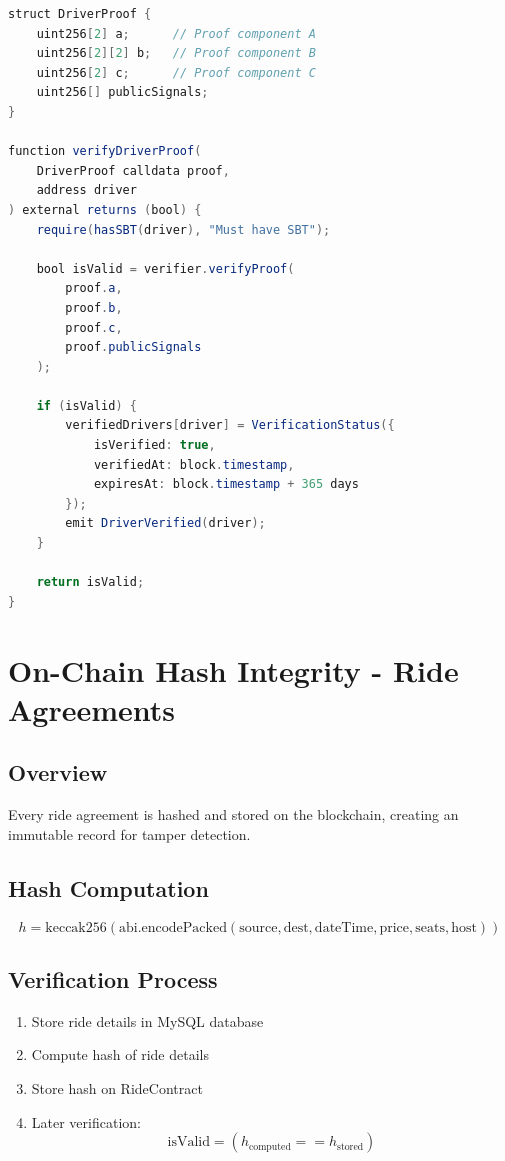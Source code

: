 \begin{lstlisting}[language=Java, caption=ZKP Verification Contract]
struct DriverProof {
    uint256[2] a;      // Proof component A
    uint256[2][2] b;   // Proof component B
    uint256[2] c;      // Proof component C
    uint256[] publicSignals;
}

function verifyDriverProof(
    DriverProof calldata proof,
    address driver
) external returns (bool) {
    require(hasSBT(driver), "Must have SBT");
    
    bool isValid = verifier.verifyProof(
        proof.a,
        proof.b,
        proof.c,
        proof.publicSignals
    );
    
    if (isValid) {
        verifiedDrivers[driver] = VerificationStatus({
            isVerified: true,
            verifiedAt: block.timestamp,
            expiresAt: block.timestamp + 365 days
        });
        emit DriverVerified(driver);
    }
    
    return isValid;
}
\end{lstlisting}

\section{On-Chain Hash Integrity - Ride Agreements}

\subsection{Overview}

Every ride agreement is hashed and stored on the blockchain, creating an immutable record for tamper detection.

\subsection{Hash Computation}

\begin{equation}
h = \text{keccak256}(\text{abi.encodePacked}(
    \text{source}, \text{dest}, \text{dateTime}, \text{price}, \text{seats}, \text{host}
))
\end{equation}

\subsection{Verification Process}

\begin{enumerate}
    \item Store ride details in MySQL database
    \item Compute hash of ride details
    \item Store hash on RideContract
    \item Later verification:
    \begin{equation}
    \text{isValid} = (h_{\text{computed}} == h_{\text{stored}})
    \end{equation}
\end{enumerate}

